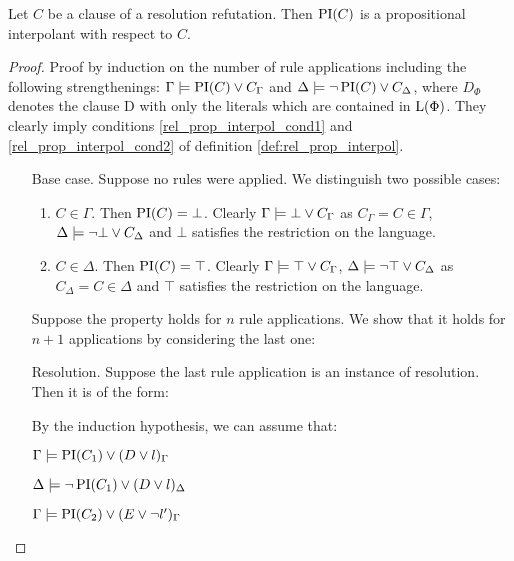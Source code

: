 \begin{prop}
	\label{prop:prop_interpol}
	Let $C$ be a clause of a resolution refutation.
	Then $\PI(C)$ is a propositional interpolant with respect to $C$. 
\end{prop}
\begin{proof}
	Proof by induction on the number of rule applications including the following strengthenings:
	$\Gamma \entails \PI(C) \lor C_\Gamma$ and
	$\Delta \entails \lnot \PI(C) \lor C_\Delta$, where $D_\Phi$ denotes the clause D with only the literals which are contained in $\Lang(\Phi)$. They clearly imply conditions \ref{rel_prop_interpol_cond1} and \ref{rel_prop_interpol_cond2} of definition \ref{def:rel_prop_interpol}. 

\begin{itemize}
	\item[Base case.]
	Suppose no rules were applied. We distinguish two possible cases:
	\begin{enumerate}
		\item $C \in \Gamma$.
			Then $\PI(C) = \bot$. Clearly $\Gamma \entails \bot \lor C_\Gamma$ as $C_\Gamma = C \in \Gamma$, $\Delta \entails \lnot \bot \lor C_\Delta$ and $\bot$ satisfies the restriction on the language.

		\item $C \in \Delta$.
			Then $\PI(C) = \top$. Clearly $\Gamma \entails \top \lor C_\Gamma$, $\Delta \entails \lnot \top \lor C_\Delta$ as $C_\Delta = C \in \Delta$ and $\top$ satisfies the restriction on the language.
	\end{enumerate}

	Suppose the property holds for $n$ rule applications.
	We show that it holds for $n+1$ applications by considering the last one:

\item[Resolution.]
	Suppose the last rule application is an instance of resolution. Then it is of the form:
	\begin{prooftree}
	\end{prooftree}

	By the induction hypothesis, we can assume that:

	$\Gamma \entails \PI(C_1) \lor (D\lor l)_\Gamma$

	$\Delta \entails \lnot \PI(C_1) \lor (D\lor l)_\Delta$

	$\Gamma \entails \PI(C_2) \lor (E\lor \lnot l')_\Gamma$


\end{itemize}
\end{proof}
